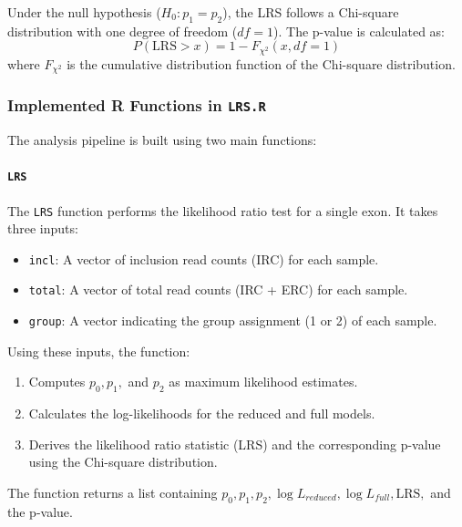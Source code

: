 \documentclass{article}
\begin{document}
    Under the null hypothesis (\( H_0: p_1 = p_2 \)), the LRS follows a Chi-square distribution with one degree of freedom (\( df = 1 \)). The p-value is calculated as:
    \begin{equation}
        P(\text{LRS} > x) = 1 - F_{\chi^2}(x, df=1)
        \label{eq:p-value}
    \end{equation}
    where \( F_{\chi^2} \) is the cumulative distribution function of the Chi-square distribution.

    \subsubsection{Implemented R Functions in \texttt{LRS.R}}
    The analysis pipeline is built using two main functions:

    \paragraph{\texttt{LRS}}
    The \texttt{LRS} function performs the likelihood ratio test for a single exon. It takes three inputs:
    \begin{itemize}
        \item \texttt{incl}: A vector of inclusion read counts (IRC) for each sample.
        \item \texttt{total}: A vector of total read counts (IRC + ERC) for each sample.
        \item \texttt{group}: A vector indicating the group assignment (1 or 2) of each sample.
    \end{itemize}
    Using these inputs, the function:
    \begin{enumerate}
        \item Computes \( p_0, p_1, \) and \( p_2 \) as maximum likelihood estimates.
        \item Calculates the log-likelihoods for the reduced and full models.
        \item Derives the likelihood ratio statistic (LRS) and the corresponding p-value using the Chi-square distribution.
    \end{enumerate}
    The function returns a list containing \( p_0, p_1, p_2, \log L_{reduced}, \log L_{full}, \text{LRS}, \) and the p-value.
\end{document}
